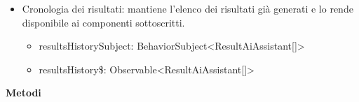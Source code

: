 \documentclass[a4paper,11pt]{article}
\begin{document}
\begin{itemize}[noitemsep, topsep=0pt]
  \begin{itemize}[noitemsep, topsep=0pt]
    \item generationErrorSubject: BehaviorSubject<string | null>
    \item currentGenerationError\$: Observable<string | null>
  \end{itemize}
  \item Cronologia dei risultati: mantiene l'elenco dei risultati già generati e lo rende disponibile ai componenti sottoscritti.
  \begin{itemize}[noitemsep, topsep=0pt]
    \item resultsHistorySubject: BehaviorSubject<ResultAiAssistant[]>
    \item resultsHistory\$: Observable<ResultAiAssistant[]>
  \end{itemize}
\end{itemize}
\textbf{Metodi}
\end{document}
